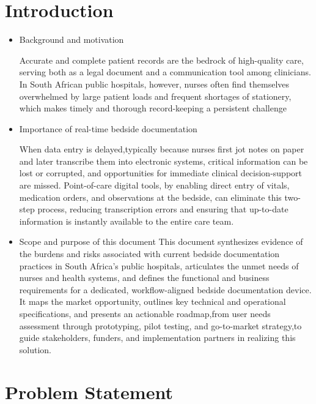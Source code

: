\documentclass[a4paper,11pt]{article}
\begin{document}
\section{Introduction}
\begin{itemize}
  \item Background and motivation

Accurate and complete patient records are the bedrock of high-quality care, serving both as a legal document and a communication tool among clinicians. In South African public hospitals, however, nurses often find themselves overwhelmed by large patient loads and frequent shortages of stationery, which makes timely and thorough record-keeping a persistent challenge \cite{mutshatshiRecordkeepingChallengesExperienced2018}
  
  \item Importance of real-time bedside documentation

When data entry is delayed,typically because nurses first jot notes on paper and later transcribe them into electronic systems, critical information can be lost or corrupted, and opportunities for immediate clinical decision-support are missed. Point-of-care digital tools, by enabling direct entry of vitals, medication orders, and observations at the bedside, can eliminate this two-step process, reducing transcription errors and ensuring that up-to-date information is instantly available to the entire care team. \cite{PDFMobileApplication}
  
  \item Scope and purpose of this document
This document synthesizes evidence of the burdens and risks associated with current bedside documentation practices in South Africa’s public hospitals, articulates the unmet needs of nurses and health systems, and defines the functional and business requirements for a dedicated, workflow-aligned bedside documentation device. It maps the market opportunity, outlines key technical and operational specifications, and presents an actionable roadmap,from user needs assessment through prototyping, pilot testing, and go-to-market strategy,to guide stakeholders, funders, and implementation partners in realizing this solution.
  
\end{itemize}

\section{Problem Statement}
\end{document}
